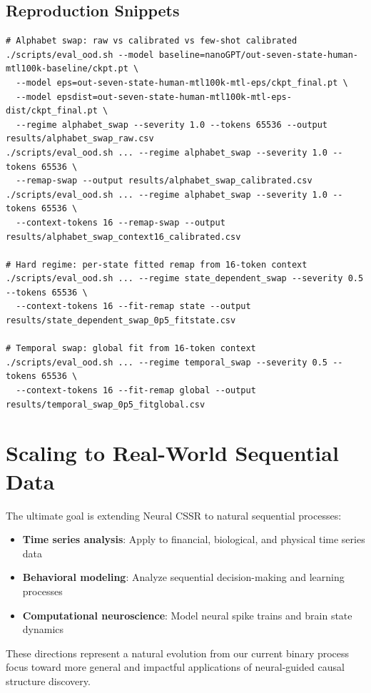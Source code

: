 \documentclass[11pt]{article}
\begin{document}
\subsection{Reproduction Snippets}
\begin{codebox}
\lstset{basicstyle=\ttfamily\scriptsize}
\begin{lstlisting}
# Alphabet swap: raw vs calibrated vs few-shot calibrated
./scripts/eval_ood.sh --model baseline=nanoGPT/out-seven-state-human-mtl100k-baseline/ckpt.pt \
  --model eps=out-seven-state-human-mtl100k-mtl-eps/ckpt_final.pt \
  --model epsdist=out-seven-state-human-mtl100k-mtl-eps-dist/ckpt_final.pt \
  --regime alphabet_swap --severity 1.0 --tokens 65536 --output results/alphabet_swap_raw.csv
./scripts/eval_ood.sh ... --regime alphabet_swap --severity 1.0 --tokens 65536 \
  --remap-swap --output results/alphabet_swap_calibrated.csv
./scripts/eval_ood.sh ... --regime alphabet_swap --severity 1.0 --tokens 65536 \
  --context-tokens 16 --remap-swap --output results/alphabet_swap_context16_calibrated.csv

# Hard regime: per-state fitted remap from 16-token context
./scripts/eval_ood.sh ... --regime state_dependent_swap --severity 0.5 --tokens 65536 \
  --context-tokens 16 --fit-remap state --output results/state_dependent_swap_0p5_fitstate.csv

# Temporal swap: global fit from 16-token context
./scripts/eval_ood.sh ... --regime temporal_swap --severity 0.5 --tokens 65536 \
  --context-tokens 16 --fit-remap global --output results/temporal_swap_0p5_fitglobal.csv
\end{lstlisting}
\end{codebox}

\section{Scaling to Real-World Sequential Data}

The ultimate goal is extending Neural CSSR to natural sequential processes:

\begin{notebox}[Real-World Applications]
\begin{itemize}
    \item \textbf{Time series analysis}: Apply to financial, biological, and physical time series data
    \item \textbf{Behavioral modeling}: Analyze sequential decision-making and learning processes
    \item \textbf{Computational neuroscience}: Model neural spike trains and brain state dynamics
\end{itemize}
\end{notebox}

These directions represent a natural evolution from our current binary process focus toward more general and impactful applications of neural-guided causal structure discovery.
\end{document}
